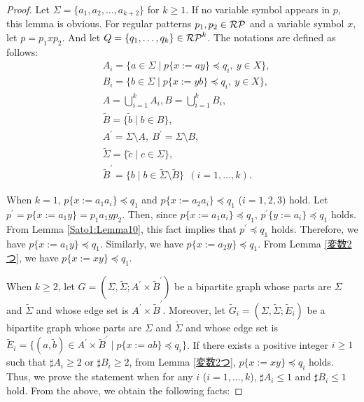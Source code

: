 \begin{proof}
Let $\Sigma=\{a_{1}, a_{2}, \ldots, a_{k+2}\}$ for $k\geq 1$.
If no variable symbol appears in $p$, this lemma is obvious.
For regular patterns $p_{1},p_{2}\in \mathcal{RP}$ and a variable symbol $x$, let $p=p_{1}xp_{2}$.
And let $Q=\{ q_{1}, \ldots , q_{k} \}\in \mathcal{RP}^{k}$.
The notations are defined as follows:
\begin{align*}
& A_{i} = \{ a \in \Sigma \mid p \{ x:=ay \} \preceq q_{i},\ y\in X\},\\ 
& B_{i} = \{ b \in \Sigma \mid p \{ x:=yb \} \preceq q_{i},\ y\in X\},\\ 
& A = \bigcup_{i=1}^{k}A_{i},B = \bigcup_{i=1}^{k} B_{i},\\
& \tilde{B} = \{ \tilde{b} \mid b \in B \},\\
& A^{\prime} = \Sigma\setminus A,~B^{\prime} = \Sigma\setminus B,\\
& \tilde{\Sigma} = \{ \tilde{c} \mid c \in \Sigma \},\\
& \tilde{B}^{\prime} = \{ b \mid b \in \tilde{\Sigma} \setminus \tilde{B} \}~~(i=1, \ldots , k).
\end{align*}


When $k=1$, $p \{ x:=a_{1}a_{i} \} \preceq q_{1}$ and $p \{ x:=a_{2}a_{i} \} \preceq q_{1}$ ($i=1,2,3$) hold.
Let $p^{\prime} = p \{ x:=a_{1}y \} = p_{1}a_{1}yp_{2}$.
Then, since $p \{ x:=a_{1}a_{i} \} \preceq q_{1}$, $p^{\prime} \{ y:=a_{i} \} \preceq q_{1}$ holds.
From Lemma \ref{Sato1:Lemma10}, this fact implies that $p^{\prime} \preceq q_{1}$ holds.
Therefore, we have $p \{ x:=a_{1}y \} \preceq q_{1}$.
Similarly, we have  $p \{ x:=a_{2}y \} \preceq q_{1}$.
From Lemma \ref{変数2つ}, we have $p \{ x:= xy \} \preceq q_{1}$.

When $k \ge 2$, let $G=(\Sigma,\tilde{\Sigma}; A^{\prime} \times \tilde{B}^{\prime})$ be a bipartite graph whose parts are $\Sigma$ and $\tilde{\Sigma}$ and whose edge set is $A^{\prime}\times\tilde{B}^{\prime}$.
Moreover, let $\tilde{G}_{i}=(\Sigma,\tilde{\Sigma}; \tilde{E}_{i})$ be a bipartite graph whose parts are $\Sigma$ and $\tilde{\Sigma}$ and whose edge set is $\tilde{E}_{i}=\{ (a, \tilde{b}) \in A^{\prime} \times \tilde{B}^{\prime} \mid p \{ x:=ab \} \preceq q_{i} \}$.
%
If there exists a positive integer $i\geq 1$ such that $\sharp A_{i} \ge 2$ or $\sharp B_{i} \ge 2$, from Lemma \ref{変数2つ}, $p \{ x:=xy \} \preceq q_{i}$ holds.
Thus, we prove the statement when for any $i$ ($i=1, \ldots , k$), $\sharp A_{i} \le 1$ and $\sharp B_{i} \le 1$ hold.
From the above, we obtain the following facts:


\end{proof}
